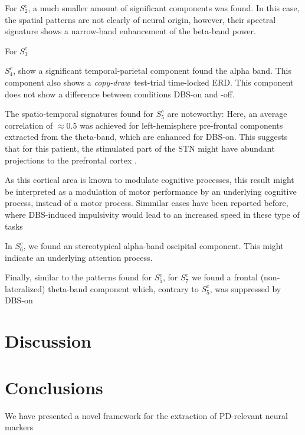 \documentclass[10pt,a4paper]{article}
\newcommand{\cpdt}[0]{\textit{copy-draw}~test}
\newcommand{\patient}[2]{$S_{#1}^{#2}$}
\begin{document}
For \patient{2}{c}, a much smaller amount of significant components was found. In this case, the spatial patterns are not clearly of neural origin, however, their spectral signature shows a narrow-band enhancement of the beta-band power.

For \patient{3}{c} 

\patient{4}{c}, show a significant temporal-parietal component found the alpha band. This component also shows a \cpdt-trial time-locked ERD. This component does not show a difference between conditions DBS-on and -off.

The spatio-temporal signatures found for \patient{5}{c} are noteworthy: Here, an average correlation of $\approx0.5$ was achieved for left-hemisphere pre-frontal components extracted from the theta-band, which are enhanced for DBS-on. This suggests that for this patient, the stimulated part of the STN might have abundant projections to the prefrontal cortex .

As this cortical area is known to modulate cognitive processes, this result might be interpreted as a modulation of motor performance by an underlying cognitive process, instead of a motor process. Simmilar cases have been reported before, where DBS-induced impulsivity would lead to an increased speed in these type of tasks \cite{IMPULSIVITY DBS}

In \patient{6}{c}, we found an stereotypical alpha-band oscipital component. This might indicate an underlying attention process. 

Finally, similar to the patterns found for \patient{5}{c}, for \patient{7}{c} we found a frontal (non-lateralized) theta-band component which, contrary to \patient{5}{c}, was suppressed by DBS-on


\section{Discussion}






\section{Conclusions}
We have presented a novel framework for the extraction of PD-relevant neural markers




\end{document}
